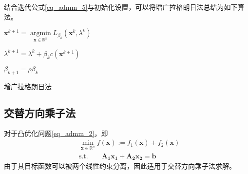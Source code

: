 结合迭代公式\ref{eq_admm_5}与初始化设置，可以将增广拉格朗日法总结为如下算法。
\begin{algorithm}\label{alg_admm_1}

    \SetAlgoLined

     {
        $\bm{x}^{k+1} = \mathop{\mathrm{argmin}}\limits_{\bm{x}\in \mathbb{R}^{n}} L_{\beta_{k}}(\bm{x}^{k}, \lambda^{k})$
        
        $\lambda^{k+1} = \lambda^{k} + \beta_{k} c(\bm{x}^{k+1})$

        $\beta_{k+1} = \rho \beta_{k}$
    }
    \caption{增广拉格朗日法}
\end{algorithm}

\subsection{交替方向乘子法}

对于凸优化问题\ref{eq_admm_2}，即
\begin{equation*}
    \begin{split}
        &\min\limits_{\bm{x}\in \mathbb{R}^{n}} f(\bm{x}) := f_{1}(\bm{x}) + f_{2}(\bm{x}) \\
        &\mathrm{s. t.} \quad\quad \bm{A_{1}x_{1}} + \bm{A_{2}x_{2}} = \bm{b} 
    \end{split}
\end{equation*}
由于其目标函数可以被两个线性约束分离，因此适用于交替方向乘子法求解。

